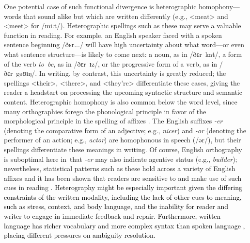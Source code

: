 \documentclass[doc,biblatex]{apa7}
\newcommand\newmaterial[1]{\textcolor{black}{#1}}
\begin{document}
One potential case of such functional divergence is heterographic homophony---words that sound alike but which are written differently (e.g., <meat> and <meet> for /miːt/). Heterographic spellings such as these may serve a valuable function in reading. For example, an English speaker faced with a spoken sentence beginning /ðɛr.../ will have high uncertainty about what word---or even what sentence structure---is likely to come next: a noun, as in /ðɛr~kat/, a form of the verb \textit{to~be}, as in /ðɛr~ɪz/, or the progressive form of a verb, as in /ðɛr~gəʊɪŋ/. In writing, by contrast, this uncertainty is greatly reduced; the spellings <their>, <there>, and <they're> differentiate these cases, giving the reader a headstart on processing the upcoming syntactic structure and semantic content. Heterographic homophony is also common below the word level, since many orthographies forego the phonological principle in favor of the morphological principle in the spelling of affixes \parencite{Sandra:2024}. The English suffixes \textit{-er} (denoting the comparative form of an adjective; e.g., \textit{nicer}) and \textit{-or} (denoting the performer of an action; e.g., \textit{actor}) are homophonous in speech (/ər/), but their spellings differentiate these meanings in writing. Of course, English orthography is suboptimal here in~that \textit{-er} may also indicate agentive status (e.g., \textit{builder}); nevertheless, statistical patterns such as these hold across a variety of English affixes \parencite{Berg:2017} and it has been shown that readers are sensitive to and make use of such cues in reading \parencite{Ulicheva:2020}. \newmaterial{Heterography might be especially important given the differing constraints of the written modality, including the lack of other cues to meaning, such as stress, context, and body language, and the inability for reader and writer to engage in immediate feedback and repair. Furthermore, written language has richer vocabulary and more complex syntax than spoken language \parencite{Biber:1988, Korochkina:2024, Nation:2022}, placing different pressures on ambiguity resolution.}
\end{document}
